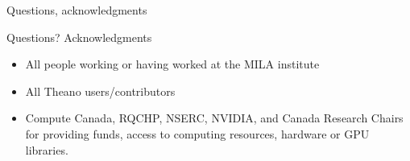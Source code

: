 \documentclass[utf8x,xcolor=pdftex,dvipsnames,table]{beamer}
\begin{document}
\begin{frame}{Questions, acknowledgments}
\Huge
\begin{center}
Questions?\newline
Acknowledgments
\end{center}
\normalsize
\begin{itemize}
\item All people working or having worked at the MILA institute
\item All Theano users/contributors
\item Compute Canada, RQCHP, NSERC, NVIDIA, and Canada Research Chairs for providing funds, access to computing resources, hardware or GPU libraries.
\end{itemize}

\end{frame}
\end{document}
